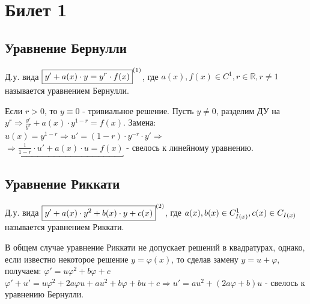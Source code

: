 




\section*{Билет 1}
\subsection*{Уравнение Бернулли}

\begin{definition}
	Д.у. вида $ \boxed{y' + a(x)\cdot y = y^r \cdot f(x)}^{\eqnum\label{eq:Ber}} $, где $ a(x), f(x) \in C^1, r \in \mathbb{ R }, r \neq 1$ называется уравнением Бернулли. \\
\end{definition}

\begin{proposition} %
	Если $ r > 0 $, то $ y \equiv 0 $ - тривиальное решение. Пусть $ y \neq 0$, разделим ДУ на $ y^r \Rightarrow \frac{ y' }{ y^r } + a(x) \cdot y^{ 1-r } = f(x).$ Замена: $ u(x) = y^{ 1-r } \Rightarrow u' = ( 1-r ) \cdot y^{ -r } \cdot y' \Rightarrow$ \\ $\Rightarrow \underbracket{ \frac{ 1 }{ 1-r } \cdot u' + a(x)\cdot u = f(x) }$ - свелось к линейному уравнению. 
\end{proposition}

\subsection*{Уравнение Риккати}

\begin{definition}
	Д.у. вида $ \boxed{y' + a(x) \cdot y^2 + b(x) \cdot y + c(x)}^{\eqnum\label{eq:Ric}} $, где $a(x),  b(x) \in C^1_{I(x)},  \\ c(x) \in C_{I(x)}$ называется уравнением Риккати. 
\end{definition}

\begin{proposition}	
	В общем случае уравнение Риккати не допускает решений в квадратурах, однако, если известно некоторое решение $ y = \varphi (x) $, то сделав замену $ y = u + \varphi $, получаем: $ \varphi' = u \varphi^2 + b\varphi + c $ \\ $ \varphi' + u' = u\varphi^2 + 2a\varphi u + au^2 + b\varphi + bu + c \Rightarrow u' = au^2 + (2a\varphi + b)u $ - свелось к уравнению Бернулли.
\end{proposition}

